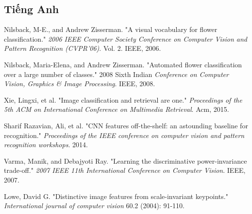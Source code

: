 \documentclass[12pt]{report}
\begin{document}
		\begin{thebibliography}{9}
																																																																																																			
			\section*{Tiếng Anh}
																																																																																																
			Nilsback, M-E., and Andrew Zisserman. "A visual vocabulary for flower classification." \textit{2006 IEEE Computer Society Conference on Computer Vision and Pattern Recognition (CVPR'06)}. Vol. 2. IEEE, 2006.													
																																																																																																			
			Nilsback, Maria-Elena, and Andrew Zisserman. "Automated flower classification over a large number of classes." 2008 Sixth Indian \textit{Conference on Computer Vision, Graphics \& Image Processing}. IEEE, 2008.
																																																																																																
			Xie, Lingxi, et al. "Image classification and retrieval are one." \textit{Proceedings of the 5th ACM on International Conference on Multimedia Retrieval}. Acm, 2015.
																																																																																																
			Sharif Razavian, Ali, et al. "CNN features off-the-shelf: an astounding baseline for recognition." \textit{Proceedings of the IEEE conference on computer vision and pattern recognition workshops}. 2014.
																																																																																															
			Varma, Manik, and Debajyoti Ray. "Learning the discriminative power-invariance trade-off."  \textit{2007 IEEE 11th International Conference on Computer Vision}. IEEE, 2007.
																																																																																										
			Lowe, David G. "Distinctive image features from scale-invariant keypoints." \textit{International journal of computer vision} 60.2 (2004): 91-110.
																																																																																																		

\end{thebibliography}
\end{document}
